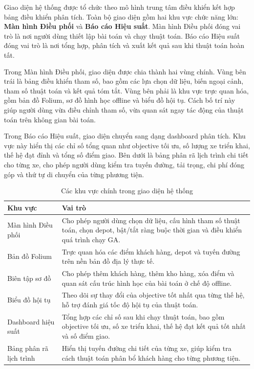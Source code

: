 \documentclass[12pt,a4paper]{article}
\numberwithin{figure}{subsection}
\begin{document}
Giao diện hệ thống được tổ chức theo mô hình trung tâm điều khiển kết hợp bảng điều khiển phân tích. Toàn bộ giao diện gồm hai khu vực chức năng lớn: \textbf{Màn hình Điều phối} và \textbf{Báo cáo Hiệu suất}. Màn hình Điều phối đóng vai trò là nơi người dùng thiết lập bài toán và chạy thuật toán. Báo cáo Hiệu suất đóng vai trò là nơi tổng hợp, phân tích và xuất kết quả sau khi thuật toán hoàn tất.

Trong Màn hình Điều phối, giao diện được chia thành hai vùng chính. Vùng bên trái là bảng điều khiển tham số, bao gồm các lựa chọn dữ liệu, biến ngoại cảnh, tham số thuật toán và kết quả tóm tắt. Vùng bên phải là khu vực trực quan hóa, gồm bản đồ Folium, sơ đồ hình học offline và biểu đồ hội tụ. Cách bố trí này giúp người dùng vừa điều chỉnh tham số, vừa quan sát ngay tác động của thuật toán trên không gian bài toán.

Trong Báo cáo Hiệu suất, giao diện chuyển sang dạng dashboard phân tích. Khu vực này hiển thị các chỉ số tổng quan như objective tối ưu, số lượng xe triển khai, thế hệ đạt đỉnh và tổng số điểm giao. Bên dưới là bảng phân rã lịch trình chi tiết cho từng xe, cho phép người dùng kiểm tra tuyến đường, tải trọng, chi phí đóng góp và thứ tự di chuyển của từng phương tiện.

\begin{table}[H]
    \centering
    \caption{Các khu vực chính trong giao diện hệ thống}
    \label{tab:ui_main_regions}
    \renewcommand{\arraystretch}{1.35}
    \begin{tabular}{|p{4cm}|p{9.8cm}|}
        \hline
        \textbf{Khu vực} & \textbf{Vai trò} \\
        \hline
        Màn hình Điều phối & Cho phép người dùng chọn dữ liệu, cấu hình tham số thuật toán, chọn depot, bật/tắt ràng buộc thời gian và điều khiển quá trình chạy GA. \\
        \hline
        Bản đồ Folium & Trực quan hóa các điểm khách hàng, depot và tuyến đường trên nền bản đồ địa lý thực tế. \\
        \hline
        Biên tập sơ đồ & Cho phép thêm khách hàng, thêm kho hàng, xóa điểm và quan sát cấu trúc hình học của bài toán ở chế độ offline. \\
        \hline
        Biểu đồ hội tụ & Theo dõi sự thay đổi của objective tốt nhất qua từng thế hệ, hỗ trợ đánh giá tốc độ hội tụ của thuật toán. \\
        \hline
        Dashboard hiệu suất & Tổng hợp các chỉ số sau khi chạy thuật toán, bao gồm objective tối ưu, số xe triển khai, thế hệ đạt kết quả tốt nhất và số điểm giao. \\
        \hline
        Bảng phân rã lịch trình & Hiển thị tuyến đường chi tiết của từng xe, giúp kiểm tra cách thuật toán phân bổ khách hàng cho từng phương tiện. \\
        \hline
    \end{tabular}
\end{table}
\end{document}
